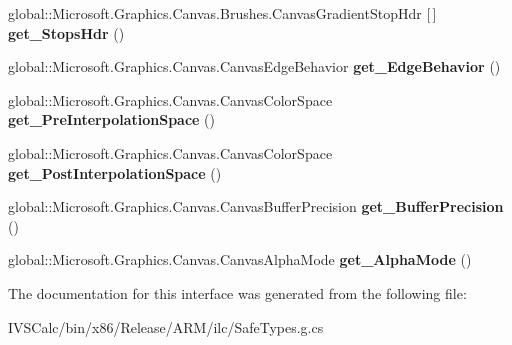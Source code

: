 \begin{DoxyCompactItemize}
\item 
\mbox{\label{interface_microsoft_1_1_graphics_1_1_canvas_1_1_brushes_1_1_i_canvas_linear_gradient_brush_a245855b464b23967c3b7710dcb9295a1}} 
global\+::\+Microsoft.\+Graphics.\+Canvas.\+Brushes.\+Canvas\+Gradient\+Stop\+Hdr \mbox{[}$\,$\mbox{]} {\bfseries get\+\_\+\+Stops\+Hdr} ()
\item 
\mbox{\label{interface_microsoft_1_1_graphics_1_1_canvas_1_1_brushes_1_1_i_canvas_linear_gradient_brush_a9f8af02ad0512ad6ea1051030ea8d8b5}} 
global\+::\+Microsoft.\+Graphics.\+Canvas.\+Canvas\+Edge\+Behavior {\bfseries get\+\_\+\+Edge\+Behavior} ()
\item 
\mbox{\label{interface_microsoft_1_1_graphics_1_1_canvas_1_1_brushes_1_1_i_canvas_linear_gradient_brush_a4fae3e034b5a7682ce6f36b1b53ca7f2}} 
global\+::\+Microsoft.\+Graphics.\+Canvas.\+Canvas\+Color\+Space {\bfseries get\+\_\+\+Pre\+Interpolation\+Space} ()
\item 
\mbox{\label{interface_microsoft_1_1_graphics_1_1_canvas_1_1_brushes_1_1_i_canvas_linear_gradient_brush_af17f5053ad253aed98e1a18bd5e60b8f}} 
global\+::\+Microsoft.\+Graphics.\+Canvas.\+Canvas\+Color\+Space {\bfseries get\+\_\+\+Post\+Interpolation\+Space} ()
\item 
\mbox{\label{interface_microsoft_1_1_graphics_1_1_canvas_1_1_brushes_1_1_i_canvas_linear_gradient_brush_a5b2b98092e712966b733302d129af2bc}} 
global\+::\+Microsoft.\+Graphics.\+Canvas.\+Canvas\+Buffer\+Precision {\bfseries get\+\_\+\+Buffer\+Precision} ()
\item 
\mbox{\label{interface_microsoft_1_1_graphics_1_1_canvas_1_1_brushes_1_1_i_canvas_linear_gradient_brush_a532e44644b9768234226a878bed13561}} 
global\+::\+Microsoft.\+Graphics.\+Canvas.\+Canvas\+Alpha\+Mode {\bfseries get\+\_\+\+Alpha\+Mode} ()
\end{DoxyCompactItemize}


The documentation for this interface was generated from the following file\+:\begin{DoxyCompactItemize}
\item 
I\+V\+S\+Calc/bin/x86/\+Release/\+A\+R\+M/ilc/Safe\+Types.\+g.\+cs\end{DoxyCompactItemize}
